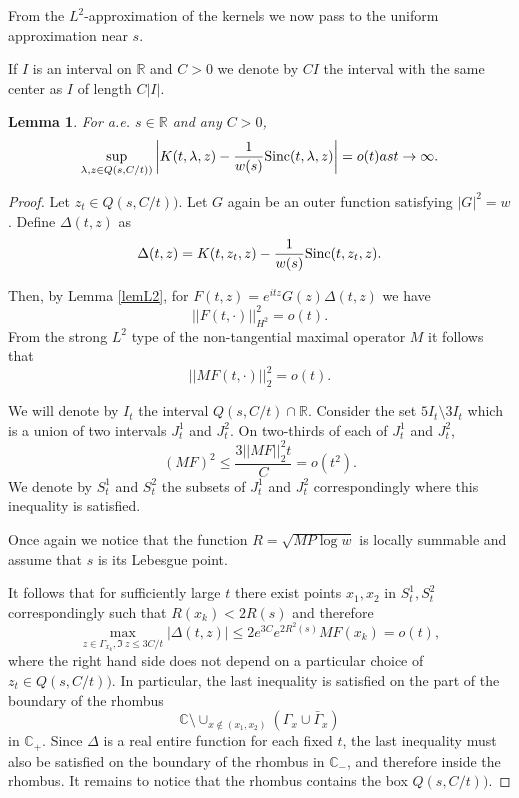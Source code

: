 \documentclass[11pt,twoside,reqno]{amsart}
\def\to{\rightarrow}
\def\R{{\mathbb R}}
\def\C{{\mathbb{C}}}
\def\l{\lambda}
\def\G{\Gamma}
\def\S{\text{\rm Sinc}}
\theoremstyle{plain}
\newtheorem{lemma}{Lemma}
\numberwithin{equation}{section}
\begin{document}
From the $L^2$-approximation of the kernels we now pass to the uniform approximation  near $s$.



If $I$ is an interval on $\R$  and $C>0$ we denote by $CI$ the interval with the same center as $I$
of length $C|I|$.


\begin{lemma}\label{supK-S} For a.e. $s\in \R$ and any  $C>0$,
\begin{equation} \sup_{\l,z\in Q(s,C/t))}\left|K(t,\l, z)-\frac{1}{w(s)}\S(t,\l, z)\right|= o(t)\textrm{ as }t\to\infty.     \end{equation}



\end{lemma}


\begin{proof}
Let $z_t\in Q(s,C/t))$.
Let $G$ again be an outer function satisfying $|G|^2=w$.
Define $\Delta(t,z)$ as
$$\Delta(t,z)=K(t,z_t, z)-\frac{1}{w(s)}\S(t,z_t, z).$$

Then, by Lemma \ref{lemL2},
for $F(t,z)=e^{itz}G(z)\Delta(t,z)$ we have
$$||F(t,\cdot)||^2_{H^2}=o(t).$$
From the strong $L^2$ type of the non-tangential maximal operator $M$ it follows that
$$||MF(t,\cdot)||^2_2=o(t).$$

We will denote by $I_t$ the interval $Q(s,C/t)\cap \R$.
 Consider the set $5I_t\setminus 3I_t$ which is a union of two intervals $J^1_t$ and $J^2_t$.
On two-thirds of each of $J_t^1$ and $J_t^2$,
$$(MF)^2\leq  \frac{3||MF||^2_{2}t}{ C}=o(t^2).$$
We denote by $S_t^1$ and $S_t^2$ the subsets of $J_t^1$ and $J_t^2$ correspondingly where this inequality is satisfied.

Once again we notice that the function $R=\sqrt{MP\log  w}$
is locally summable and  assume that $s$ is its Lebesgue point.


 It follows that for sufficiently large  $t$ there exist points $x_1,x_2$ in
$S_t^1,S_t^2$ correspondingly such that $R(x_k)<2R(s)$ and therefore
$$\max_{z\in \G_{x_k}, \Im\  z\leq 3C/t} |\Delta(t,z)|\leq 2e^{3C} e^{2R^2(s)} MF(x_k) =o(t),$$
where the right hand side does not depend on a particular choice of $z_t\in Q(s,C/t))$.
In particular, the last inequality is satisfied on the part of the boundary of the rhombus
\begin{equation}\C\setminus \cup_{x\not\in (x_1,x_2)} (\Gamma_x \cup \bar\Gamma_x)\label{eq0A}\end{equation}
in $\C_+$.
Since $\Delta$ is a real entire function for each fixed $t$, the last inequality
must also be satisfied on the boundary of the rhombus in $\C_-$, and therefore inside the rhombus. It remains to notice
that the rhombus contains the box $Q(s,C/t))$.
\end{proof}
\end{document}
